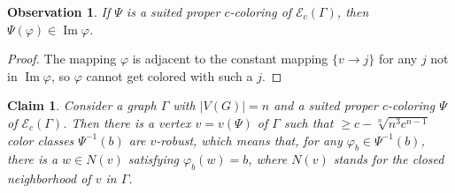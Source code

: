 \documentclass{amsart}
\newtheorem{obs}[thr]{Observation}
\newtheorem{claim}[thr]{Claim}
\theoremstyle{definition}
\theoremstyle{remark}
\numberwithin{equation}{section}
\def\E{\mathcal{E}}
\def\E{\mathcal{E}}
\begin{document}
\begin{obs}\label{obs1}
If $\Psi$ is a suited proper $c$-coloring of $\E_c(\Gamma)$, then $\Psi(\varphi)\in\operatorname{Im}\varphi$.
\end{obs}

\begin{proof}
The mapping $\varphi$ is adjacent to the constant mapping $\{v\to j\}$ for any $j$ not in $\operatorname{Im}\varphi$, so $\varphi$ cannot get colored with such a $j$.
\end{proof}


\begin{claim}\label{lem3}
Consider a graph $\Gamma$ with $|V(G)|=n$ and a suited proper $c$-coloring $\Psi$ of $\E_c(\Gamma)$. Then there is a vertex $v=v(\Psi)$ of $\Gamma$ such that $\geqslant c-\sqrt[n]{n^3c^{n-1}}$ color classes $\Psi^{-1}(b)$ are $v$\textit{-robust}, which means that, for any $\varphi_b\in\Psi^{-1}(b)$, there is a $w\in N(v)$ satisfying $\varphi_b(w)=b$, where $N(v)$ stands for the closed neighborhood of $v$ in $\Gamma$.
\end{claim}
\end{document}

